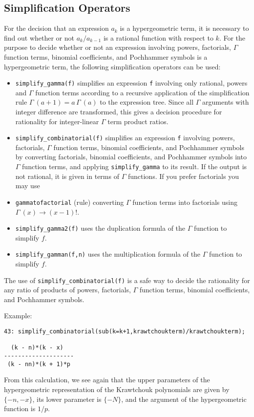 \subsection{Simplification Operators}
For the decision that an expression $a_k$ is a hypergeometric term, it is 
necessary to find out whether or not $a_{k}/a_{k-1}$ is a rational
function with respect to $k$. For the purpose to decide
whether or not an expression involving powers, factorials,
$\Gamma$ function terms, 
binomial coefficients, and Pochhammer symbols is a hypergeometric term,
the following simplification operators can be used:
\begin{itemize}
\item
{\tt simplify\verb+_+gamma(f)} simplifies an expression {\tt f} involving 
only rational, powers and $\Gamma$ function terms according to a recursive 
application of the simplification rule $\Gamma\:(a+1)=a\,\Gamma\:(a)$ 
to the expression tree. Since all $\Gamma$ arguments with integer difference
are transformed, this gives a decision procedure for rationality
for integer-linear $\Gamma$ term product ratios.
\item
{\tt simplify\verb+_+combinatorial(f)} simplifies an expression {\tt f} 
involving powers, factorials, $\Gamma$ function terms,
binomial coefficients, and Pochhammer symbols by converting
factorials, binomial coefficients, and Poch\-hammer symbols into 
$\Gamma$ function terms, and applying {\tt simplify\verb+_+gamma} to its
result. If the output is not rational,
it is given in terms of $\Gamma$ functions. If you prefer factorials
you may use
\item
{\tt gammatofactorial} (rule) converting $\Gamma$ function terms into
factorials using $\Gamma\:(x)\rightarrow (x-1)!$.
\item
{\tt simplify\verb+_+gamma2(f)}
uses the duplication formula of the $\Gamma$ function to simplify $f$.
\item
{\tt simplify\verb+_+gamman(f,n)}
uses the multiplication formula of the $\Gamma$ function to simplify $f$.
\end{itemize}
The use of {\tt simplify\verb+_+combinatorial(f)} is a safe way to
decide the rationality for any ratio of products of powers, factorials,
$\Gamma$ function terms, binomial coefficients, and Pochhammer symbols.

Example:

{\small
\begin{verbatim}
43: simplify_combinatorial(sub(k=k+1,krawtchoukterm)/krawtchoukterm);

  (k - n)*(k - x)
--------------------
 (k - nn)*(k + 1)*p
\end{verbatim}
}\noindent
From this calculation, we see again that the upper parameters of
the hypergeometric representation of the Krawtchouk polynomials are given by
$\{-n,-x\}$, its lower parameter is $\{-N\}$, and the argument of the
hypergeometric function is $1/p$.

